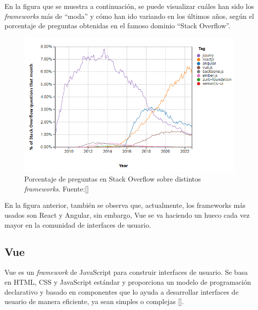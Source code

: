 En la figura que se muestra a continuación, se puede visualizar cuáles han sido los \textit{frameworks} más de ``moda'' y cómo han ido variando en los últimos años, según el porcentaje de preguntas obtenidas en el famoso dominio ``Stack Overflow''.

\begin{figure}[htp]
\centering
\includegraphics[scale=0.9]{Graphics/stackoverflow}
\caption{Porcentaje de preguntas en Stack Overflow sobre distintos \textit{frameworks}. Fuente:[\cite{50}]}
\label{fig:stackoverflow}
\end{figure}

En la figura anterior, también se observa que, actualmente, los frameworks más usados son React y Angular, sin embargo, Vue se va haciendo un hueco cada vez mayor en la comunidad de interfaces de usuario.


\subsection{Vue}
Vue es un \textit{framework} de JavaScript para construir interfaces de usuario. Se basa en HTML, CSS y JavaScript estándar y proporciona un modelo de programación declarativo y basado en componentes que lo ayuda a desarrollar interfaces de usuario de manera eficiente, ya sean simples o complejas [\cite{47}].

